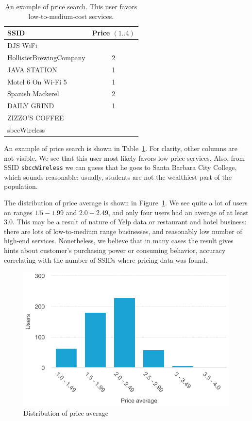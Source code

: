 \documentclass[12pt,a4paper,oneside,pdftex]{report}
\begin{document}
\begin{table}
\center
    \begin{tabular}{|l|c|}
    \hline
        \textbf{SSID}           & \textbf{Price $(1..4)$} \\ \hline
        DJS WiFi                &       \\ \hline
        HollisterBrewingCompany & 2     \\ \hline
        JAVA STATION            & 1     \\ \hline
        Motel 6 On Wi-Fi 5      & 1     \\ \hline
        Spanish Mackerel        & 2     \\ \hline
        DAILY GRIND             & 1     \\ \hline
        ZIZZO'S COFFEE          &       \\ \hline
        sbccWireless            &       \\ \hline
    \end{tabular}
    \caption{An example of price search. This user favors low-to-medium-cost services.}
    \label{tab:example_price}
\end{table}

An example of price search is shown in Table~\ref{tab:example_price}. For clarity, other columns are not visible. We see that this user most likely favors low-price services. Also, from SSID \texttt{sbccWireless} we can guess that he goes to Santa Barbara City College, which sounds reasonable: usually, students are not the wealthiest part of the population.

The distribution of price average is shown in Figure~\ref{fig:prices_users}. We see quite a lot of users on ranges $1.5-1.99$ and $2.0 - 2.49$, and only four users had an average of at least 3.0. This may be a result of nature of Yelp data or restaurant and hotel business: there are lots of low-to-medium range businesses, and reasonably low number of high-end services. Nonetheless, we believe that in many cases the result gives hints about customer's purchasing power or consuming behavior, accuracy correlating with the number of SSIDs where pricing data was found.

\begin{figure}
    \center
    \includegraphics{images/prices_users}
    \caption{Distribution of price average}
    \label{fig:prices_users}
\end{figure}
\end{document}
